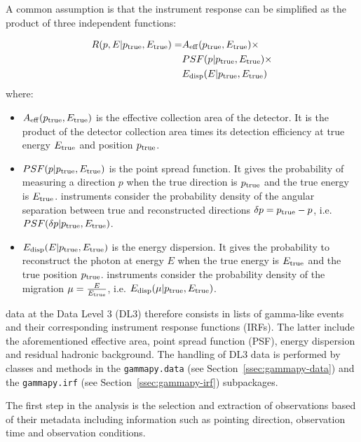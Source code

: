 \documentclass[traditabstract, longauth]{aa}
\newcommand{\code}[1]{\texttt{#1}}
\begin{document}
A common assumption is that the instrument response can be simplified as the product
of three independent functions:

\begin{align}
   R(p, E|p_{\rm true}, E_{\rm true}) = &A_{\rm eff}(p_{\rm true}, E_{\rm true}) \times\\
    &PSF(p|p_{\rm true}, E_{\rm true}) \times\\
    &E_{\rm disp}(E|p_{\rm true}, E_{\rm true})
\end{align}
where:
\begin{itemize}
\item $A_{\rm eff}(p_{\rm true}, E_{\rm true})$ is the effective collection area of the detector. It is the product
  of the detector collection area times its detection efficiency at true energy $E_{\rm true}$ and position $p_{\rm true}$.
\item $PSF(p|p_{\rm true}, E_{\rm true})$ is the point spread function. It gives the probability of
  measuring a direction $p$ when the true direction is $p_{\rm true}$ and the true energy is $E_{\rm true}$.
  \gammaray instruments consider the probability density of the angular separation between true and reconstructed directions
  $\delta p = p_{\rm true} - p$, i.e. $PSF(\delta p|p_{\rm true}, E_{\rm true})$.
\item $E_{\rm disp}(E|p_{\rm true}, E_{\rm true})$ is the energy dispersion. It gives the probability to
  reconstruct the photon at energy $E$ when the true energy is $E_{\rm true}$ and the true position $p_{\rm true}$.
  \gammaray instruments consider the probability density of the migration $\mu=\frac{E}{E_{\rm true}}$,
  i.e. $E_{\rm disp}(\mu|p_{\rm true}, E_{\rm true})$.
\end{itemize}

\gammaray data at the Data Level 3 (DL3) therefore consists in lists of gamma-like events and their
corresponding instrument response functions (IRFs). The latter include the aforementioned
effective area, point spread function (PSF), energy dispersion and residual hadronic background.
The handling of DL3 data is performed by classes and methods
in the \code{gammapy.data} (see Section~\ref{ssec:gammapy-data}) and the \code{gammapy.irf}
(see Section~\ref{ssec:gammapy-irf}) subpackages.

The first step in the analysis is the selection and extraction of observations
based of their metadata including information such as pointing direction, observation
time and observation conditions.
\end{document}
